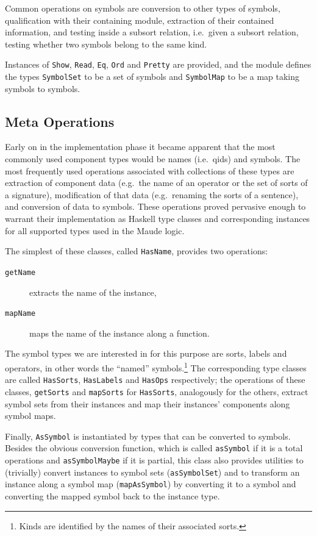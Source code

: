 \documentclass[11pt]{article}
\begin{document}
Common operations on symbols are conversion to other types of symbols, qualification with their containing module, extraction of their contained information, and testing inside a subsort relation, i.e.\ given a subsort relation, testing whether two symbols belong to the same kind.

Instances of \texttt{Show}, \texttt{Read}, \texttt{Eq}, \texttt{Ord} and \texttt{Pretty} are provided, and the module defines the types \texttt{SymbolSet} to be a set of symbols and \texttt{SymbolMap} to be a map taking symbols to symbols.


\subsection{Meta Operations}
\label{sub:implementation_meta}

Early on in the implementation phase it became apparent that the most commonly used component types would be names (i.e.\ qids) and symbols. The most frequently used operations associated with collections of these types are extraction of component data (e.g.\ the name of an operator or the set of sorts of a signature), modification of that data (e.g.\ renaming the sorts of a sentence), and conversion of data to symbols. These operations proved pervasive enough to warrant their implementation as Haskell type classes and corresponding instances for all supported types used in the Maude logic.

The simplest of these classes, called \texttt{HasName}, provides two operations:

\begin{description}
  \item[\texttt{getName}] extracts the name of the instance,
  \item[\texttt{mapName}] maps the name of the instance along a function.
\end{description}

The symbol types we are interested in for this purpose are sorts, labels and operators, in other words the ``named'' symbols.\footnote{Kinds are identified by the names of their associated sorts.} The corresponding type classes are called \texttt{HasSorts}, \texttt{HasLabels} and \texttt{HasOps} respectively; the operations of these classes, \texttt{getSorts} and \texttt{mapSorts} for \texttt{HasSorts}, analogously for the others, extract symbol sets from their instances and map their instances' components along symbol maps.

Finally, \texttt{AsSymbol} is instantiated by types that can be converted to symbols. Besides the obvious conversion function, which is called \texttt{asSymbol} if it is a total operations and \texttt{asSymbolMaybe} if it is partial, this class also provides utilities to (trivially) convert instances to symbol sets (\texttt{asSymbolSet}) and to transform an instance along a symbol map (\texttt{mapAsSymbol}) by converting it to a symbol and converting the mapped symbol back to the instance type.
\end{document}
